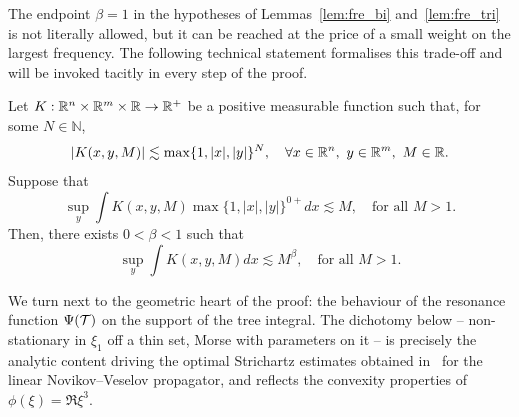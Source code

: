 The endpoint $\beta=1$ in the hypotheses of Lemmas~\ref{lem:fre_bi} and~\ref{lem:fre_tri} is not literally allowed, but it can be reached at the price of a small weight on the largest frequency. The following technical statement formalises this trade-off and will be invoked tacitly in every step of the proof.

\begin{lemma}\label{lem:eta1}
    Let $K:\mathbb{R}^n\times \mathbb{R}^m\times \mathbb{R}\to \mathbb{R}^+$ be a positive measurable function such that, for some $N\in \mathbb{N}$,
    $$
    |K(x,y,M)|\lesssim \max\{1,|x|,|y|\}^N,\quad \forall x\in\mathbb{R}^n,\ y\in \mathbb{R}^m, \ M\in \mathbb{R}.
    $$
    Suppose that
    $$
    \sup_y \int K(x,y,M)\max\{1,|x|,|y|\}^{0+} dx \lesssim M,\quad \mbox{for all }M>1.
    $$
    Then, there exists $0<\beta<1$ such that
    $$
    \sup_y \int K(x,y,M) dx \lesssim M^{\beta},\quad \mbox{for all } M>1.
    $$
\end{lemma}

We turn next to the geometric heart of the proof: the behaviour of the resonance function $\Psi(\mathcal{T})$ on the support of the tree integral. The dichotomy below -- non-stationary in $\xi_1$ off a thin set, Morse with parameters on it -- is precisely the analytic content driving the optimal Strichartz estimates obtained in~\cite{kazeykinamunoz1, kazeykinamunoz2} for the linear Novikov--Veselov propagator, and reflects the convexity properties of $\phi(\xi)=\Re\xi^3$.


